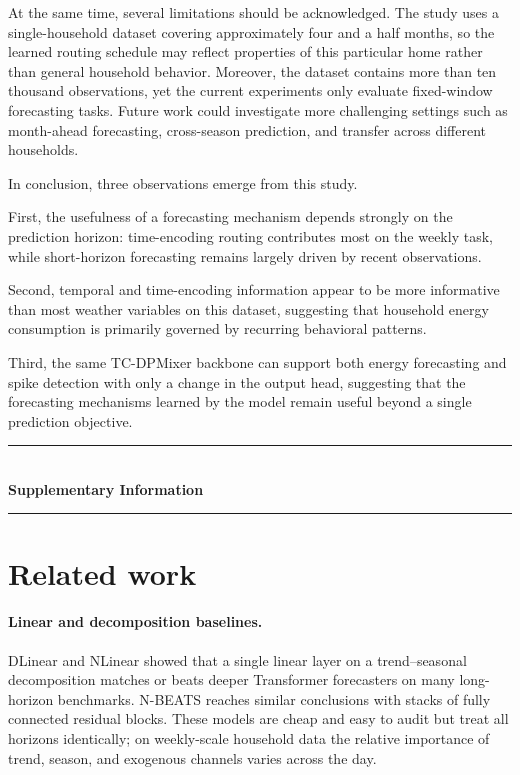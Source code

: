 \documentclass{article}
\begin{document}
At the same time, several limitations should be acknowledged. The
study uses a single-household dataset covering approximately four and
a half months, so the learned routing schedule may reflect properties
of this particular home rather than general household behavior.
Moreover, the dataset contains more than ten thousand observations,
yet the current experiments only evaluate fixed-window forecasting
tasks. Future work could investigate more challenging settings such
as month-ahead forecasting, cross-season prediction, and transfer
across different households.

In conclusion, three observations emerge from this study.

First,
the usefulness of a forecasting mechanism depends strongly on the
prediction horizon: time-encoding routing contributes most on
the weekly task, while short-horizon forecasting remains largely
driven by recent observations. 


Second, temporal and time-encoding information appear to be more
informative than most weather variables on this dataset, suggesting
that household energy consumption is primarily governed by recurring
behavioral patterns. 

Third, the same TC-DPMixer backbone can support both energy forecasting and spike detection with only a change in the output head, suggesting that the forecasting mechanisms learned by the model remain useful beyond a single prediction objective.
\newpage
\appendix

\begin{center}
  \vspace{2em}
  \rule{0.7\linewidth}{0.6pt}\\[0.8em]
  {\Huge\bfseries Supplementary Information}\\[0.5em]
  \rule{0.7\linewidth}{0.6pt}
  \vspace{2em}
\end{center}

\section{Related work}
\label{si:related}

\paragraph{Linear and decomposition baselines.}
DLinear and NLinear \citep{dlinear} showed that a single linear layer
on a trend--seasonal decomposition matches or beats deeper Transformer
forecasters on many long-horizon benchmarks. N-BEATS \citep{nbeats}
reaches similar conclusions with stacks of fully connected residual
blocks. These models are cheap and easy to audit but treat all
horizons identically; on weekly-scale household data the relative
importance of trend, season, and exogenous channels varies across
the day.
\end{document}
